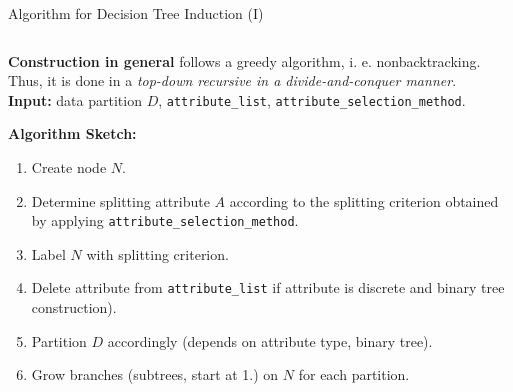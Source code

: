 \begin{frame}{Algorithm for Decision Tree Induction (I)}
	\begin{columns}
		\begin{column}{0.75\textwidth}
			\textbf{Construction in general} follows a greedy algorithm,
			i. e. nonbacktracking. Thus, it is done in a \textit{top-down recursive in a
				divide-and-conquer manner}.\\\medskip
			\textbf{Input:} data partition $D$, \texttt{attribute\_list}, \texttt{attribute\_selection\_method}.\\\medskip

			\textbf{Algorithm Sketch:}
			\begin{enumerate}
				\item Create node $N$.
				\item Determine splitting attribute $A$ according to the splitting criterion
				      obtained by applying \texttt{attribute\_selection\_method}.
				\item Label $N$ with splitting criterion.
				\item Delete attribute from \texttt{attribute\_list} if attribute is discrete and binary tree construction).
				\item Partition $D$ accordingly (depends on attribute type, binary tree).
				\item Grow branches (subtrees, start at 1.) on $N$ for each partition.
			\end{enumerate}



\end{column}
\end{columns}
\end{frame}

